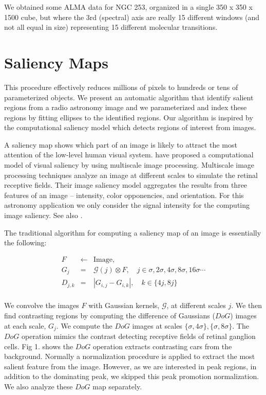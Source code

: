 We obtained some ALMA data for NGC 253, organized in a single 350 x 350 x 1500
cube, but where the 3rd (spectral) 
axis are really 15 different windows (and not all equal in
size) representing 15 different molecular transitions.


\section{Saliency Maps}

This procedure effectively reduces millions of pixels to hundreds or
tens of parameterized objects.  We present an automatic algorithm that
identify salient regions from a radio astronomy image and we
parameterized and index these regions by fitting ellipses to the
identified regions.  Our algorithm is inspired by the computational
saliency model which detects regions of interest from images.


A saliency map shows which part of an image is likely to attract the
most attention of the low-level human visual system.
\cite{itti98:_model_of_salien_based_visual} have proposed a
computational model of visual saliency by using multiscale image
processing.  Multiscale image processing techniques analyze an image
at different scales to simulate the retinal receptive fields.  Their
image saliency model aggregates the results from three features of an
image -- intensity, color opponencies, and orientation. For this
astronomy application we only consider the signal intensity for the
computing image saliency. See also \citep{ip2012hierarchical}.

The traditional algorithm for computing a saliency map of an image is essentially
the following:

\begin{eqnarray*}
  \label{eqn:sal}
  F      & \leftarrow & \mathrm{Image}, \\
  G_{j}   & =          & \mathcal{G}(j) \otimes F, \quad j \in{\sigma,2\sigma,4\sigma,8\sigma,16\sigma
 \cdots}\\
  D_{j,k}  & =         & |G_{i,j} - G_{i,k}|, \quad k \in \{4j,8j\}\\
\end{eqnarray*}


We convolve the images $F$
with Gaussian kernels, $\mathcal{G}$, at different scales $j$.  We
then find contrasting regions by computing the difference of Gaussians
($DoG$) images at each scale, $G_{j}$.  We compute the $DoG$ images
at scales $\{\sigma,4\sigma\}, \{\sigma,8\sigma\}$.  The $DoG$
operation mimics the contrast detecting receptive fields of retinal
ganglion cells.  Fig 1. shows the $DoG$ operation
extracts contrasting cars from the background.  Normally a
normalization procedure is applied to extract the most salient feature
from the image.  However, as we are interested in peak regions, in
addition to the dominating peak, we skipped this peak promotion
normalization.  We also analyze these $DoG$ map separately.

